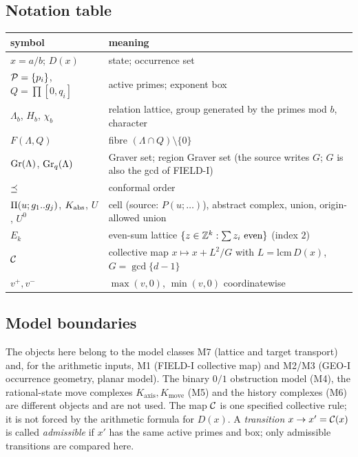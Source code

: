 \subsection{Notation table}
\begin{center}\small
\begin{tabular}{@{}p{}p{}@{}}\toprule
symbol & meaning\\\midrule
$x=a/b$; $D(x)$ & state; occurrence set\\
$\mathcal P=\{p_i\}$, $Q=\prod[0,q_i]$ & active primes; exponent box\\
$\Lambda_b$, $H_b$, $\chi_b$ & relation lattice, group generated by the primes mod $b$, character\\
$F(\Lambda,Q)$ & fibre $(\Lambda\cap Q)\setminus\{0\}$\\
$\operatorname{Gr}(\Lambda)$, $\operatorname{Gr}_q(\Lambda)$ & Graver set; region Graver set (the source writes $G$; $G$ is also the gcd of FIELD-I)\\
$\preceq$ & conformal order\\
$\Pi(u;g_1..g_j)$, $K_{\mathrm{abs}}$, $U$, $U^0$ & cell (source: $P(u;\dots)$), abstract complex, union, origin-allowed union\\
$E_k$ & even-sum lattice $\{z\in\mathbb Z^k:\sum z_i\text{ even}\}$ (index $2$)\\
$\mathcal C$ & collective map $x\mapsto x+L^2/G$ with $L=\mathrm{lcm}\,D(x)$, $G=\gcd\{d-1\}$\\
$v^+,v^-$ & $\max(v,0)$, $\min(v,0)$ coordinatewise\\\bottomrule
\end{tabular}
\end{center}

\subsection{Model boundaries}
The objects here belong to the model classes M7 (lattice and target transport) and, for the arithmetic inputs, M1 (FIELD-I collective map) and M2/M3 (GEO-I occurrence geometry, planar model). The binary $0/1$ obstruction model (M4), the rational-state move complexes $K_{\mathrm{axis}},K_{\mathrm{move}}$ (M5) and the history complexes (M6) are different objects and are not used. The map $\mathcal C$ is one specified collective rule; it is not forced by the arithmetic formula for $D(x)$. A \emph{transition} $x\to x'=\mathcal C(x)$ is called \emph{admissible} if $x'$ has the same active primes and box; only admissible transitions are compared here.
